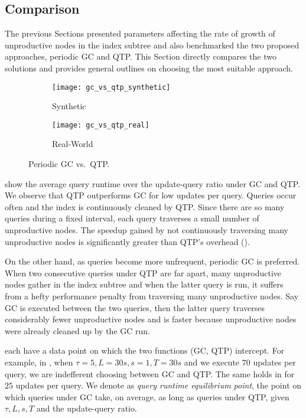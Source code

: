 \documentclass[abstracton,12pt]{scrartcl}
\theoremstyle{definition}
\begin{document}
\newpage

\subsection{Comparison}

\label{sec:comparison}

The previous Sections presented parameters affecting the rate of growth of
unproductive nodes in the index subtree and also benchmarked the two proposed
approaches, periodic GC and QTP. This Section directly compares the
two solutions and provides general outlines on choosing the most suitable
approach.

\begin{figure}[h]
  \centering
  \begin{subfigure}{0.49\linewidth}
    \centering
    \caption{Synthetic}
    \texttt{[image: gc\_vs\_qtp\_synthetic]}
    \label{fig:gc_vs_qtp_synthetic}
  \end{subfigure}
  \begin{subfigure}{0.49\linewidth}
    \centering
    \caption{Real-World}
    \texttt{[image: gc\_vs\_qtp\_real]}
    \label{fig:gc_vs_qtp_real}
  \end{subfigure}
  \vspace{-0.5cm}
  \caption[Periodic GC vs.\ QTP]{Periodic GC vs.\ QTP.}
\end{figure}

 show the average query
runtime over the update-query ratio under GC and QTP.
We observe that QTP outperforms GC for low
updates per query. Queries occur often and the index is continuously cleaned by QTP.
Since there are so many queries during a fixed interval, each query traverses
a small number of unproductive nodes. The speedup gained by not continuously traversing 
many unproductive nodes is significantly greater than QTP's overhead 
().

On the other hand, as queries become more unfrequent, periodic GC is preferred.
When two consecutive queries under QTP are far apart, many unproductive nodes
gather in the index subtree and when the latter query is run, it
suffers from a hefty performance penalty from traversing many unproductive nodes.
Say GC is executed between the two queries, then the latter query traverses
considerably fewer unproductive nodes and is faster because unproductive nodes
were already cleaned up by the GC run.

 each have a data point
on which the two functions (GC, QTP) intercept. For example, in
, when $\tau = 5, L = 30s, s = 1, T = 30s$ and
we execute $70$ updates per query, we are indefferent choosing between GC
and QTP. The same holds in  for $25$ updates
per query. We denote as \textit{query runtime equilibrium point}, the point on which queries
under GC take, on average, as long as queries under QTP, given $\tau, L, s, T$
and the update-query ratio.
\end{document}
